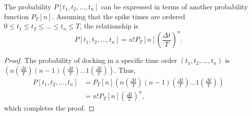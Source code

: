 \begin{thm}
  The probability $P[t_1,t_2,...,t_n]$ can be expressed in terms of another probability function $P_T[n]$. Assuming that the spike times are ordered $0\leq t_1\leq t_2\leq ...\leq t_n\leq T$, the relationship is 
  \begin{equation}
    P[t_1,t_2,...,t_n]=n!{P_T[n]\left (\frac{\Delta t}{T}\right )^n}.
    \label{equ:1.26}
  \end{equation}
  \begin{proof}
    The probability of docking in a specific time order $(t_1,t_2,...,t_n)$ is $\left(n(\frac{\Delta t}{T})(n-1)(\frac{\Delta t}{T})\dots 1(\frac{\Delta t}{T})\right)$. Thus,%
    \begin{displaymath}
      \begin{aligned}
        P[t_1,t_2,...,t_n]&={P_T[n]}(n(\frac{\Delta t}{T})(n-1)(\frac{\Delta t}{T})\dots 1(\frac{\Delta t}{T}))\\
        &=n!{P_T[n]\left(\frac{\Delta t}{T}\right)^n},
      \end{aligned}
    \end{displaymath}
    which completes the proof.
  \end{proof}\qedhere
\end{thm}

